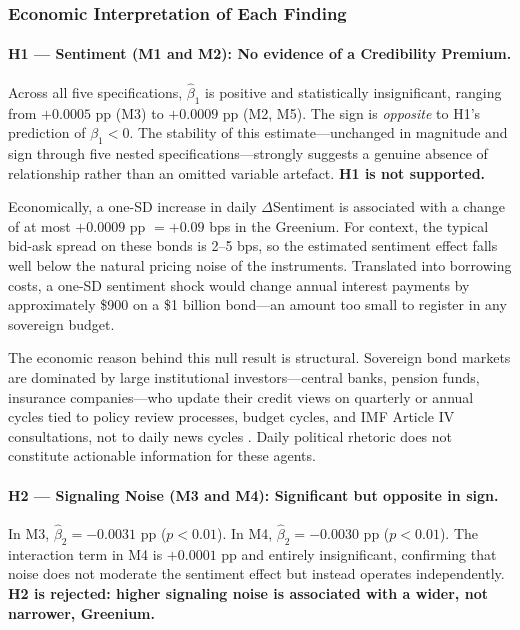 \documentclass[12pt,a4paper]{article}
\begin{document}
\subsubsection{Economic Interpretation of Each Finding}

\paragraph{H1 --- Sentiment (M1 and M2): No evidence of a Credibility Premium.}

Across all five specifications, $\hat{\beta}_1$ is positive and statistically insignificant, ranging from $+0.0005$ pp (M3) to $+0.0009$ pp (M2, M5). The sign is \textit{opposite} to H1's prediction of $\beta_1 < 0$. The stability of this estimate---unchanged in magnitude and sign through five nested specifications---strongly suggests a genuine absence of relationship rather than an omitted variable artefact. \textbf{H1 is not supported.}

Economically, a one-SD increase in daily $\Delta$Sentiment is associated with a change of at most $+0.0009$ pp $= +0.09$ bps in the Greenium. For context, the typical bid-ask spread on these bonds is 2--5 bps, so the estimated sentiment effect falls well below the natural pricing noise of the instruments. Translated into borrowing costs, a one-SD sentiment shock would change annual interest payments by approximately \$900 on a \$1 billion bond---an amount too small to register in any sovereign budget.

The economic reason behind this null result is structural. Sovereign bond markets are dominated by large institutional investors---central banks, pension funds, insurance companies---who update their credit views on quarterly or annual cycles tied to policy review processes, budget cycles, and IMF Article IV consultations, not to daily news cycles \citep{Gürkaynak2005}. Daily political rhetoric does not constitute actionable information for these agents.

\paragraph{H2 --- Signaling Noise (M3 and M4): Significant but opposite in sign.}

In M3, $\hat{\beta}_2 = -0.0031$ pp ($p < 0.01$). In M4, $\hat{\beta}_2 = -0.0030$ pp ($p < 0.01$). The interaction term in M4 is $+0.0001$ pp and entirely insignificant, confirming that noise does not moderate the sentiment effect but instead operates independently. \textbf{H2 is rejected: higher signaling noise is associated with a wider, not narrower, Greenium.}
\end{document}
